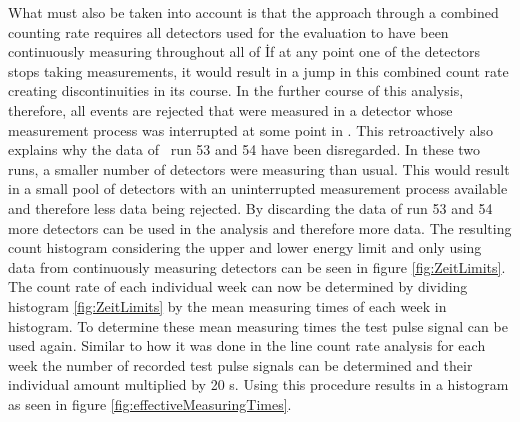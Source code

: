 What must also be taken into account is that the approach through a combined counting rate requires all detectors used for the evaluation to have been continuously measuring throughout all of \PII\.
If at any point one of the detectors stops taking measurements, it would result in a jump in this combined count rate creating discontinuities in its course.    
In the further course of this analysis, therefore, all events are rejected that were measured in a detector whose measurement process was interrupted at some point in \PII.
This retroactively also explains why the data of \gerda\ run 53 and 54 have been disregarded.
In these two runs, a smaller number of detectors were measuring than usual.
This would result in a small pool of detectors with an uninterrupted measurement process available and therefore less data being rejected.
By discarding the data of run 53 and 54 more detectors can be used in the analysis and therefore more data.
The resulting count histogram considering the upper and lower energy limit and only using data from continuously measuring detectors can be seen in figure \ref{fig:ZeitLimits}.
\\

The count rate of each individual week can now be determined by dividing histogram \ref{fig:ZeitLimits} by the mean measuring times of each week in histogram.
To determine these mean measuring times the test pulse signal can be used again.
Similar to how it was done in the line count rate analysis for each week the number of recorded test pulse signals can be determined and their individual amount multiplied by 20 s.
Using this procedure results in a histogram as seen in figure \ref{fig:effectiveMeasuringTimes}.
\\

